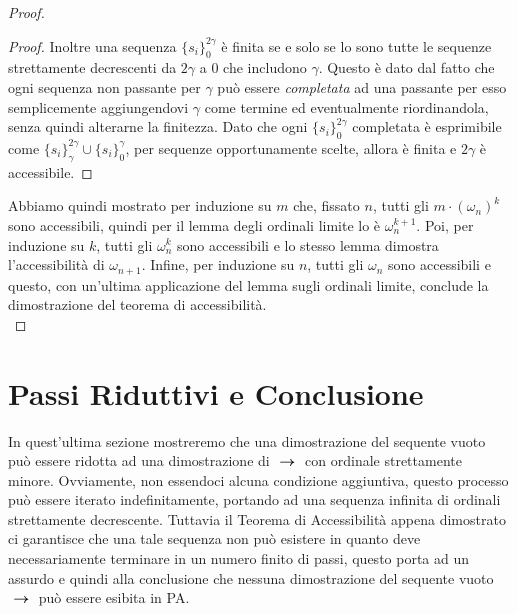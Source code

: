 \begin{proof}
\begin{proof}
			Inoltre una sequenza $\{s_{i}\}^{2\gamma}_{0}$ è finita se e solo se lo sono tutte le sequenze strettamente decrescenti da $2\gamma$ a $0$ che includono $\gamma$. Questo è dato dal fatto che ogni sequenza non passante per $\gamma$ può essere \emph{completata} ad una passante per esso semplicemente aggiungendovi $\gamma$ come termine ed eventualmente riordinandola, senza quindi alterarne la finitezza.
			Dato che ogni $\{s_{i}\}^{2\gamma}_{0}$ completata è esprimibile come $\{s_{i}\}^{2\gamma}_{\gamma} \cup \{s_{i}\}^{\gamma}_{0}$, per sequenze opportunamente scelte, allora è finita e $2\gamma$ è accessibile.
		\end{proof}
		Abbiamo quindi mostrato per induzione su $m$ che, fissato $n$, tutti gli $m\cdot(\omega_{n})^k$ sono accessibili, quindi per il lemma degli ordinali limite lo è $\omega_{n}^{k+1}$. Poi, per induzione su $k$, tutti gli $\omega_{n}^{k}$ sono accessibili e lo stesso lemma dimostra l'accessibilità di $\omega_{n+1}$. Infine, per induzione su $n$, tutti gli $\omega_{n}$ sono accessibili e questo, con un'ultima applicazione del lemma sugli ordinali limite, conclude la dimostrazione del teorema di accessibilità.\\
		\qedhere
	\end{proof}
	\begin{comment}
		"questa dimostrazione l'ho inventata perché quella di gentzen usa la forma decimale degli ordinali e dei passaggi difficilmente traducibili nella forma di cantor qui esposta, metre quella del Takeuti non l'ho capita granché..."
	\end{comment}
\section{Passi Riduttivi e Conclusione}
		In quest'ultima sezione mostreremo che una dimostrazione del sequente vuoto può essere ridotta ad una dimostrazione di $\ \bm{\rightarrow} \; $ con ordinale strettamente minore. Ovviamente, non essendoci alcuna condizione aggiuntiva, questo processo può essere iterato indefinitamente, portando ad una sequenza infinita di ordinali strettamente decrescente. Tuttavia il Teorema di Accessibilità appena dimostrato ci garantisce che una tale sequenza non può esistere in quanto deve necessariamente terminare in un numero finito di passi, questo porta ad un assurdo e quindi alla conclusione che nessuna dimostrazione del sequente vuoto $\ \bm{\rightarrow} \; $ può essere esibita in PA.
		
